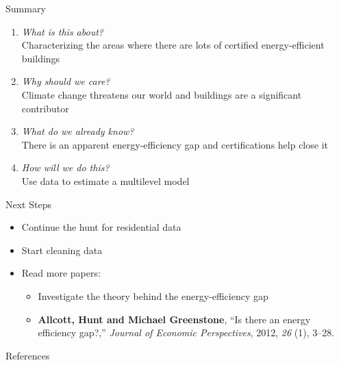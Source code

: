 \documentclass[11pt]{beamer}
\begin{document}


\begin{frame}{Summary}
\begin{enumerate}
	\item \textit{What is this about?}\\
	
	Characterizing the areas where there are lots of certified energy-efficient buildings
	\vfill
	\pause
	\item \textit{Why should we care?}\\
	
	Climate change threatens our world and buildings are a significant contributor
	\vfill
	\pause
	\item \textit{What do we already know?}\\
	
	There is an apparent energy-efficiency gap and certifications help close it
	\vfill
	\pause
	\item \textit{How will we do this?}\\
	
	Use data to estimate a multilevel model
\end{enumerate}
\end{frame}


\begin{frame}{Next Steps}
\textit{}
\begin{itemize}
	\item Continue the hunt for residential data
	\item Start cleaning data
	\item Read more papers:
	\begin{itemize}
			\item Investigate the theory behind the energy-efficiency gap
			\item {\bf Allcott, Hunt and Michael Greenstone}, ``Is there an energy efficiency
  gap?,'' {\it Journal of Economic Perspectives}, 2012, {\it 26} (1), 3--28.
	\end{itemize}
\end{itemize}
\end{frame}




\begin{frame}[allowframebreaks]{References}
\small

\end{frame}

\end{document}
